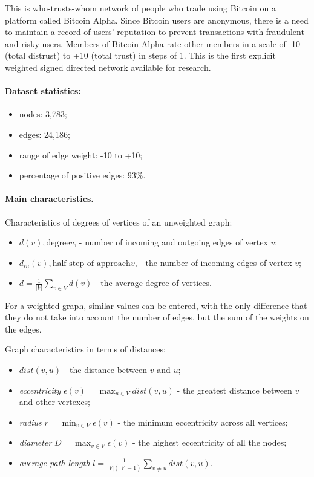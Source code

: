 This is who-trusts-whom network of people who trade using Bitcoin on a platform called Bitcoin Alpha.
Since Bitcoin users are anonymous, there is a need to maintain a record of users' reputation to prevent transactions with fraudulent and risky users.
Members of Bitcoin Alpha rate other members in a scale of -10 (total distrust) to +10 (total trust) in steps of 1.
This is the first explicit weighted signed directed network available for research.

\paragraph{Dataset statistics:}
\begin{itemize}
    \item nodes: 3,783;
    \item edges: 24,186;
    \item range of edge weight: -10 to +10;
    \item percentage of positive edges: 93\%.
\end{itemize}

\paragraph{Main characteristics.}
Characteristics of degrees of vertices of an unweighted graph:
\begin{itemize}
    \item $d(v), \text{degree} v$, - number of incoming and outgoing edges of vertex $v$;
    \item $d_{in}(v), \text{half-step of approach} v$, - the number of incoming edges of vertex $v$;
    \item $\bar{d} = \frac{1}{\lvert V \rvert}\sum_{v \in V}{d(v)}$ - the average degree of vertices.
\end{itemize}

For a weighted graph, similar values can be entered, with the only difference that they do not take into account the number of edges, but the sum of the weights on the edges.

Graph characteristics in terms of distances:
\begin{itemize}
    \item $dist(v, u)$ - the distance between $v$ and $u$;
    \item \textit{eccentricity} $\epsilon(v) = \max_{u \in V}dist(v, u)$ - the greatest distance between $v$ and other vertexes;
    \item \textit{radius} $r = \min_{v \in V}\epsilon(v)$ - the minimum eccentricity across all vertices;
    \item \textit{diameter} $D = \max_{v \in V}\epsilon(v)$ - the highest eccentricity of all the nodes;
    \item \textit{average path length} $l = \frac{1}{\lvert V \rvert(\lvert V \rvert - 1)}\sum_{v \neq u}dist(v, u)$.
\end{itemize}

